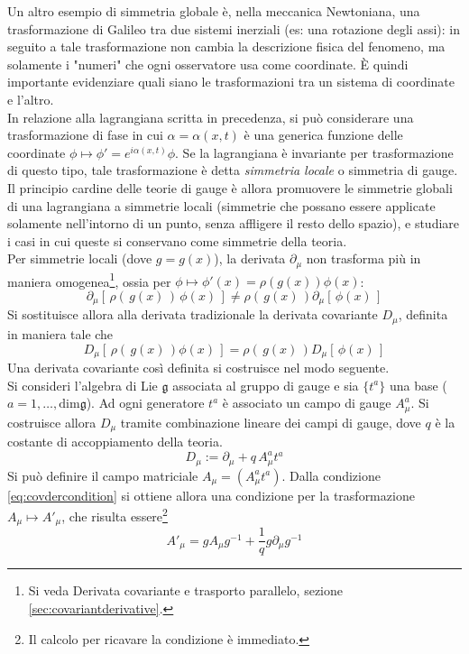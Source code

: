 Un altro esempio di simmetria globale è, nella meccanica Newtoniana, una
trasformazione di Galileo tra due sistemi inerziali (es: una rotazione degli assi):
in seguito a tale trasformazione non cambia la descrizione fisica del fenomeno,
ma solamente i "numeri" che ogni osservatore usa come coordinate. È quindi importante
evidenziare quali siano le trasformazioni tra un sistema di coordinate e l'altro.\\

In relazione alla lagrangiana scritta in precedenza, si può considerare una trasformazione
di fase in cui $\alpha = \alpha(x,t)$ è una generica funzione delle coordinate
$\phi \mapsto \phi' = e^{i\alpha(x,t)}\phi$. Se la lagrangiana è invariante per
trasformazione di questo tipo, tale trasformazione è detta \emph{simmetria locale}
o simmetria di gauge.\\

Il principio cardine delle teorie di gauge è allora promuovere le simmetrie globali
di una lagrangiana a simmetrie locali (simmetrie che possano essere applicate
solamente nell'intorno di un punto, senza affligere il resto dello spazio), e studiare
i casi in cui queste si conservano come simmetrie della teoria. \\

Per simmetrie locali (dove $g = g(x)$), la derivata $\partial _\mu$ non trasforma
più in maniera omogenea\footnote{
    Si veda Derivata covariante e trasporto parallelo, sezione \ref{sec:covariantderivative}.
}, ossia per $\phi \mapsto \phi'(x) = \rho(g(x))\phi(x)$:
$$
   \partial _\mu [\, \rho(\, g(x) \,) \, \phi(x)\, ]
       \neq  \rho(\, g(x) \,) \partial _\mu [\, \phi(x) \,]
$$
Si sostituisce allora alla derivata tradizionale la derivata covariante $D _\mu$,
definita in maniera tale che
\begin{equation}\label{eq:covdercondition}
   D _\mu[\, \rho(\, g(x) \,) \phi(x) \,] = \rho(\, g(x) \,) D _\mu[\, \phi(x) \,]
\end{equation}
Una derivata covariante così definita si costruisce nel modo seguente.\\

Si consideri l'algebra di Lie $\mathfrak{g}$ associata al gruppo di gauge e sia
$\{ t^a \}$ una base ($a = 1, \dots, \mathrm{dim}\mathfrak{g}$). Ad ogni generatore
$ t^a $ è associato un campo di gauge $ A^a_\mu $. Si costruisce allora $ D _\mu $ tramite
combinazione lineare dei campi di gauge, dove $q$ è la costante di accoppiamento della
teoria.
\begin{equation}
   D _\mu := \partial _\mu + q \, A^a_\mu t^a
\end{equation}
Si può definire il campo matriciale $A _\mu = (A^a_\mu t^a)$. Dalla condizione
\ref{eq:covdercondition} si ottiene allora una condizione per la trasformazione
 $A _\mu \mapsto A' _\mu$, che risulta essere\footnote{ Il calcolo per ricavare
la condizione è immediato.}
\begin{equation}\label{eq:gaugetrasform}
   A'_\mu = g A_\mu g^{-1} + \frac{1}{q} g \partial _\mu g^ {-1}
\end{equation}

